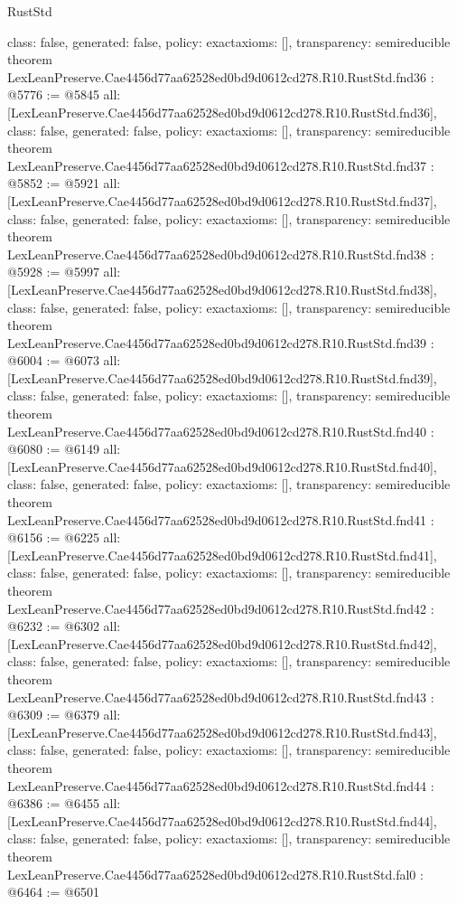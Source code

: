 \begin{lexlean}{RustStd}
\begin{coremodule}
{  class: false,
  generated: false,
  policy: exact{axioms: []},
  transparency: semireducible
}
theorem LexLeanPreserve.Cae4456d77aa62528ed0bd9d0612cd278.R10.RustStd.fnd36 : @5776 := @5845 {
  all: [LexLeanPreserve.Cae4456d77aa62528ed0bd9d0612cd278.R10.RustStd.fnd36],
  class: false,
  generated: false,
  policy: exact{axioms: []},
  transparency: semireducible
}
theorem LexLeanPreserve.Cae4456d77aa62528ed0bd9d0612cd278.R10.RustStd.fnd37 : @5852 := @5921 {
  all: [LexLeanPreserve.Cae4456d77aa62528ed0bd9d0612cd278.R10.RustStd.fnd37],
  class: false,
  generated: false,
  policy: exact{axioms: []},
  transparency: semireducible
}
theorem LexLeanPreserve.Cae4456d77aa62528ed0bd9d0612cd278.R10.RustStd.fnd38 : @5928 := @5997 {
  all: [LexLeanPreserve.Cae4456d77aa62528ed0bd9d0612cd278.R10.RustStd.fnd38],
  class: false,
  generated: false,
  policy: exact{axioms: []},
  transparency: semireducible
}
theorem LexLeanPreserve.Cae4456d77aa62528ed0bd9d0612cd278.R10.RustStd.fnd39 : @6004 := @6073 {
  all: [LexLeanPreserve.Cae4456d77aa62528ed0bd9d0612cd278.R10.RustStd.fnd39],
  class: false,
  generated: false,
  policy: exact{axioms: []},
  transparency: semireducible
}
theorem LexLeanPreserve.Cae4456d77aa62528ed0bd9d0612cd278.R10.RustStd.fnd40 : @6080 := @6149 {
  all: [LexLeanPreserve.Cae4456d77aa62528ed0bd9d0612cd278.R10.RustStd.fnd40],
  class: false,
  generated: false,
  policy: exact{axioms: []},
  transparency: semireducible
}
theorem LexLeanPreserve.Cae4456d77aa62528ed0bd9d0612cd278.R10.RustStd.fnd41 : @6156 := @6225 {
  all: [LexLeanPreserve.Cae4456d77aa62528ed0bd9d0612cd278.R10.RustStd.fnd41],
  class: false,
  generated: false,
  policy: exact{axioms: []},
  transparency: semireducible
}
theorem LexLeanPreserve.Cae4456d77aa62528ed0bd9d0612cd278.R10.RustStd.fnd42 : @6232 := @6302 {
  all: [LexLeanPreserve.Cae4456d77aa62528ed0bd9d0612cd278.R10.RustStd.fnd42],
  class: false,
  generated: false,
  policy: exact{axioms: []},
  transparency: semireducible
}
theorem LexLeanPreserve.Cae4456d77aa62528ed0bd9d0612cd278.R10.RustStd.fnd43 : @6309 := @6379 {
  all: [LexLeanPreserve.Cae4456d77aa62528ed0bd9d0612cd278.R10.RustStd.fnd43],
  class: false,
  generated: false,
  policy: exact{axioms: []},
  transparency: semireducible
}
theorem LexLeanPreserve.Cae4456d77aa62528ed0bd9d0612cd278.R10.RustStd.fnd44 : @6386 := @6455 {
  all: [LexLeanPreserve.Cae4456d77aa62528ed0bd9d0612cd278.R10.RustStd.fnd44],
  class: false,
  generated: false,
  policy: exact{axioms: []},
  transparency: semireducible
}
theorem LexLeanPreserve.Cae4456d77aa62528ed0bd9d0612cd278.R10.RustStd.fal0 : @6464 := @6501 {
}
\end{coremodule}
\end{lexlean}
